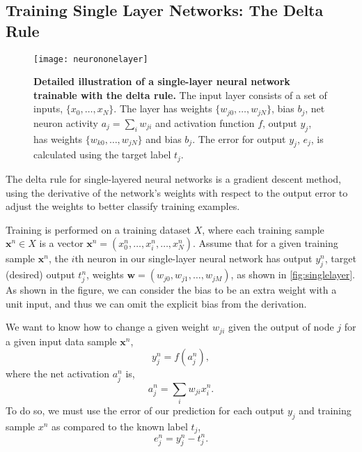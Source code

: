 \documentclass[thesis]{subfiles}
\begin{document}
\subsection{Training Single Layer Networks: The Delta Rule}
\label{deltarule}
\begin{figure}[tbp]
\centering
\texttt{[image: neurononelayer]}
\caption[Detailed illustration of a single-layer neural network]{\textbf{Detailed illustration of a single-layer neural network trainable with the delta rule.} The input layer consists of a set of inputs, $\{x_{0}, \ldots, x_{N}\}$. The layer has weights $\{w_{j0}, \ldots, w_{jN}\}$, bias $b_j$, net neuron activity $a_j = \sum_i w_{ji}$ and activation function $f$, output $y_j$, has weights $\{w_{k0}, \ldots, w_{jN}\}$ and bias $b_j$. The error for output $y_j$, $e_j$, is calculated using the target label $t_j$.}
\label{fig:neurononelayer}
\end{figure}

The delta rule for single-layered neural networks is a gradient descent method, using the derivative of the network's weights with respect to the output error to adjust the weights to better classify training examples.

Training is performed on a training dataset $X$, where each training sample $\mathbf{x}^n\in X$ is a vector $\mathbf{x}^n = (x^n_0, \ldots, x^n_i, \ldots, x^n_N)$. Assume that for a given training sample $\mathbf{x}^n$, the $i$th neuron in our single-layer neural network has output $y^n_j$, target (desired) output $t^n_j$, weights $\mathbf{w}=(w_{j0}, w_{j1}, \ldots, w_{jM})$, as shown in \cref{fig:singlelayer}. As shown in the figure, we can consider the bias to be an extra weight with a unit input, and thus we can omit the explicit bias from the derivation. 

We want to know how to change a given weight $w_{ji}$ given the output of node $j$ for a given input data sample $\mathbf{x}^n$, 
\begin{equation}
	y^n_j = f\left( a^n_j \right),
	\label{eqn:output}
\end{equation}
where the net activation $a^n_j$ is,
\begin{equation}
	a^n_j = \sum_i w_{ji} x^n_{i}.
	\label{eqn:weightsum}
\end{equation}
To do so, we must use the error of our prediction for each output $y_j$ and training sample $x^n$ as compared to the known label $t_j$,
\begin{equation}
    e^n_j = y^n_j - t^n_j.
    \label{eqn:error}
\end{equation}
\end{document}
